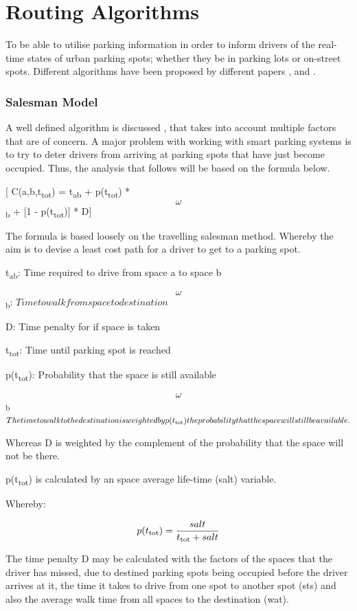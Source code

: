 \section{Routing Algorithms}
To be able to utilise parking information in order to inform drivers of the real-time states of urban parking spots; whether they be in parking lots or on-street spots. Different algorithms have been proposed by different papers \cite{4}, \cite{6} and \cite{7}.

\subsubsection{Salesman Model}
A well defined algorithm is discussed \cite{6}, that takes into account multiple factors that are of concern. A major problem with working with smart parking systems is to try to deter drivers from arriving at parking spots that have just become occupied. Thus, the analysis that follows will be based on the formula below.

[ C(a,b,t\textsubscript{tot}) = t\textsubscript{ab} + p(t\textsubscript{tot}) * \[\omega\]\textsubscript{b} + [1 - p(t\textsubscript{tot})] * D]

The formula is based loosely on the travelling salesman method. Whereby the aim is to devise a least cost path for a driver to get to a parking spot.

t\textsubscript{ab}: Time required to drive from space a to space b

\[\omega\]\textsubscript{b}: $ Time to walk from space to destination $

D: Time penalty for if space is taken

t\textsubscript{tot}: Time until parking spot is reached

p(t\textsubscript{tot}): Probability that the space is still available

\[\omega\]\textsubscript{b} $ The time to walk to the destination is weighted by p(t\textsubscript{tot}) the probability that the space will still be available. $

Whereas D is weighted by the complement of the probability that the space will not be there.

p(t\textsubscript{tot}) is calculated by an space average life-time (salt) variable. 

Whereby: 

\[ p(t\textsubscript{tot}) = \frac{salt}{t\textsubscript{tot} + salt} \]

The time penalty D may be calculated with the factors of the spaces that the driver has missed, due to destined parking spots being occupied before the driver arrives at it, the time it takes to drive from one spot to another spot (sts) and also the average walk time from all spaces to the destination (wat).

